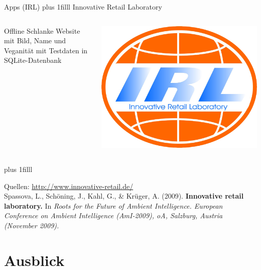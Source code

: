 \documentclass{beamer}
\begin{document}
\begin{frame}{Apps (IRL)}
	\vskip0pt plus 1filll
	{\large Innovative Retail Laboratory}
	\begin{columns}
			\begin{block}{Offline}
				Schlanke Website mit Bild, Name und Veganität mit
				Testdaten in SQLite-Datenbank
			\end{block}
			\centering
			\includegraphics[scale=0.1]{pics/irl.png}
	\end{columns}

	\vskip0pt plus 1filll
	\par\hrulefill\par
	\tiny{Quellen: \url{http://www.innovative-retail.de/}}\\
	Spassova, L., Schöning, J., Kahl, G., \& Krüger, A. (2009).
	\textbf{Innovative retail laboratory.} In \textit{Roots for the Future of Ambient
	Intelligence. European Conference on Ambient Intelligence
	(AmI-2009), oA, Salzburg, Austria (November 2009).}
\end{frame}

\section{Ausblick}
\end{document}
